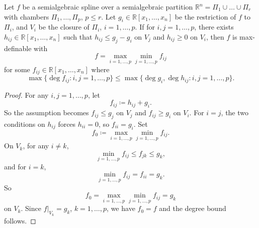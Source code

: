 \documentclass[10pt,a4paper]{amsart}
\begin{document}
\begin{lemma}\label{lemma:eff1}
Let $f$ be a semialgebraic spline over  a semialgebraic partition $\mathbb{R}^n = \Pi_1 \cup \dots \cup \Pi_r$ with chambers $\Pi_1,\dots,\Pi_p$,  $p \le r$. Let $g_i \in \mathbb{R}[x_1, \dots, x_n]$ be the restriction of $f$ to $\Pi_i$, and $V_i $ be the closure of $\Pi_i$, $i =1,\dots,p$. If for $ i, j = 1,\dots, p$, there exists $h_{ij} \in \mathbb{R}[x_1, \dots, x_n]$ such that $h_{ij} \le g_j-g_i$ on $V_j$ and $h_{ij} \ge 0 $ on $V_i$, then $f$ is max-definable with
\[
f = \max_{i = 1,\dots,p} \min_{j = 1,\dots,p} f_{ij}
\]
for some $f_{ij} \in \mathbb{R}[x_1, \dots, x_n]$ where
\[
\max \{ \deg f_{ij} : i, j = 1,\dots,p\} \le \max \{\deg g_i, \deg h_{ij} : i, j = 1,\dots, p\}.
\]
\end{lemma}

\begin{proof}
For any $i, j = 1,\dots, p$, let
\[
f_{ij} \coloneqq h_{ij}+g_i.
\]
So the assumption becomes $f_{ij} \le g_j$  on $V_j$ and $f_{ij} \ge g_i $ on $V_i$. For $i = j$, the two conditions on $h_{ij}$ forces $h_{ii} = 0$, so $f_{ii} = g_i$. Set
\[
f_0 \coloneqq \max_{i = 1,\dots,p} \min_{j = 1, \dots, p}f_{ij}.
\]
On $V_k$, for any $i \neq k$,
\[
\min_{j = 1,\dots,p} f_{ij} \le f_{jk} \le g_k,
\]
and for $i = k$,
\[
\min_{j = 1,\dots,p} f_{ij} = f_{ii} = g_k.
\]
So
\[
f_0 = \max_{i = 1,\dots,p} \min_{j = 1,\dots,p} f_{ij} = g_k
\]
on $V_k$. Since $f\rvert_{V_k} = g_k$, $k=1,\dots,p$, we have $f_0 = f$ and the degree bound follows.
\end{proof}
\end{document}
